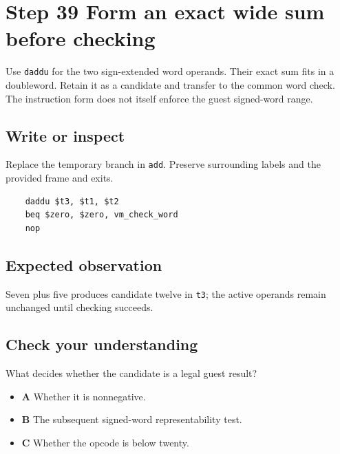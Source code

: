 \section{Step 39 Form an exact wide sum before checking}\label{vm-s39}

Use \texttt{daddu} for the two sign-extended word operands. Their exact sum fits in a doubleword. Retain it as a candidate and transfer to the common word check. The instruction form does not itself enforce the guest signed-word range.

\subsection{Write or inspect}
Replace the temporary branch in \texttt{add}. Preserve surrounding labels and the provided frame and exits.

\begin{verbatim}
    daddu $t3, $t1, $t2
    beq $zero, $zero, vm_check_word
    nop
\end{verbatim}
\subsection{Expected observation}
Seven plus five produces candidate twelve in \texttt{t3}; the active operands remain unchanged until checking succeeds.

\subsection{Check your understanding}
What decides whether the candidate is a legal guest result?

\begin{itemize}
  \item \textbf{A} Whether it is nonnegative.
  \item \textbf{B} The subsequent signed-word representability test.
  \item \textbf{C} Whether the opcode is below twenty.
\end{itemize}

